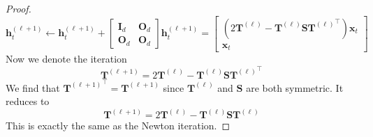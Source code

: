 \documentclass[11pt]{article}
\theoremstyle{plain}
\theoremstyle{definition}
\theoremstyle{remark}
\renewcommand{\^}[1]{^{(#1)}}
\newcommand{\bx}{\boldsymbol{x}}
\newcommand{\bh}{\boldsymbol{h}}
\newcommand{\bO}{\boldsymbol{O}}
\newcommand{\bI}{\boldsymbol{I}}
\newcommand{\bS}{\boldsymbol{S}}
\newcommand{\bT}{\boldsymbol{T}}
\begin{document}
\begin{proof}
    \begin{equation}
        \bh_t^{(\ell+1)} \leftarrow \bh_t^{(\ell+1)} + \begin{bmatrix}
            \bI_d & \bO_d \\ 
            \bO_d & \bO_d 
        \end{bmatrix} \bh_t^{(\ell+1)} = \begin{bmatrix}
        \left(2\bT^{(\ell)} -  \bT^{(\ell)} \bS {\bT^{(\ell)}}^\top \right) \bx_t \\ \bx_t 
    \end{bmatrix}
    \end{equation}
    Now we denote the iteration
    \begin{equation}
        \bT^{(\ell+1)} = 2\bT^{(\ell)} -  \bT^{(\ell)} \bS {\bT^{(\ell)}}^\top
    \end{equation}
    We find that ${\bT^{(\ell+1)}}^\top =  \bT^{(\ell+1)}$ since $ \bT^{(\ell)}$ and $\bS$ are both symmetric. It reduces to 
    \begin{equation}
        \bT^{(\ell+1)} = 2\bT^{(\ell)} -  \bT^{(\ell)} \bS {\bT^{(\ell)}}
    \end{equation}
    This is exactly the same as the Newton iteration. 


\end{proof}
\end{document}
